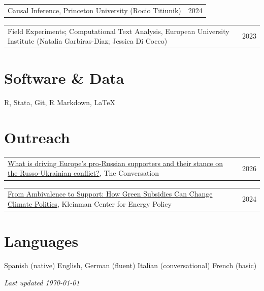 \documentclass[11pt,letterpaper]{article}
\makeatletter
\newcommand{\simpleitem}[2]{%
  \begin{tabularx}{\linewidth}{@{}X r@{}}
    #1 & {\color{muted}#2}\\
  \end{tabularx}\vspace{0.1em}
}
\makeatother
\begin{document}
\simpleitem{Causal Inference, Princeton University (Rocio Titiunik)}{2024}
\simpleitem{Field Experiments; Computational Text Analysis, European University Institute (Natalia Garbiras-D\'iaz; Jessica Di Cocco)}{2023}


\section{Software \& Data}

R, Stata, Git, R Markdown, \LaTeX


\section{Outreach}

\simpleitem{\href{https://theconversation.com/what-is-driving-europes-pro-russian-supporters-and-their-stance-on-the-russo-ukrainian-conflict-281598}{What is driving Europe's pro‑Russian supporters and their stance on the Russo‑Ukrainian conflict?}, The Conversation}{2026}
\simpleitem{\href{https://kleinmanenergy.upenn.edu/commentary/blog/insights-from-the-the-political-economy-of-climate-change-and-the-environment-2024-mini-conference/}{From Ambivalence to Support: How Green Subsidies Can Change Climate Politics}, Kleinman Center for Energy Policy}{2024}


\section{Languages}

Spanish (native) \quad\textbullet\quad English, German (fluent) \quad\textbullet\quad Italian (conversational) \quad\textbullet\quad French (basic)

\vfill
\begin{flushright}
{\color{muted}\textit{Last updated \today}}
\end{flushright}
\end{document}
